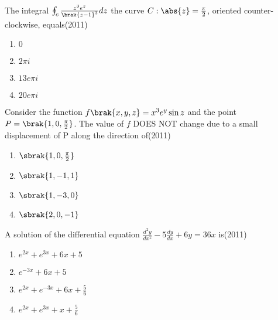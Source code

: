 \iffalse
\chapter{2011}
\author{AI24BTECH11022}
\section{xe}
\fi

\item The integral $\oint_{c}\frac{z^{3}e^{z}}{\brak{z - 1}^{3}}dz$ the curve $C:\abs{z}=\frac{\pi}{2}$, oriented counter-clockwise, equals\hfill(2011)
\begin{multicols}{2}
\begin{enumerate}
\item $0$
\item $2\pi i$
\item $13e\pi i$
\item $20e\pi i$
\end{enumerate}
\end{multicols}


\item Consider the function $f\brak{x,y,z}=x^{3}e^{y}\sin{z}$ and the point $P=\brak{1,0,\frac{\pi}{2}}$. The value of $f$ DOES NOT change due to a small displacement of P along the direction of\hfill(2011)
\begin{multicols}{2}
\begin{enumerate}
\item $\sbrak{1,0,\frac{\pi}{2}}$
\item $\sbrak{1,-1,1}$
\item $\sbrak{1,-3,0}$
\item $\sbrak{2,0,-1}$
\end{enumerate}
\end{multicols}


\item A solution of the differential equation $\frac{d^{2}y}{dx^{2}}-5\frac{dy}{dx}+6y=36x$ is\hfill(2011)
\begin{multicols}{2}
\begin{enumerate}
\item $e^{2x}+e^{3x}+6x+5$
\item $e^{-3x}+6x+5$
\item $e^{2x}+e^{-3x}+6x+\frac{5}{6}$
\item $e^{2x}+e^{3x}+x+\frac{5}{6}$
\end{enumerate}
\end{multicols}

